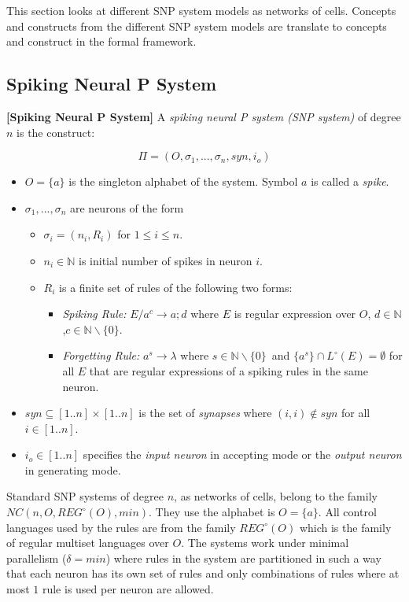 \documentclass[a4paper]{article}
\theoremstyle{definition}
\newcommand{\ra}{\rightarrow}
\begin{document}
This section looks at different SNP system models as networks of cells. Concepts and constructs from
the different SNP system models are translate to concepts and construct in the formal framework.  

\subsection{Spiking Neural P System}

\label{def-snp} \textbf{[Spiking Neural P System]} A \emph{spiking neural P system
(SNP system)} \cite{ionescu-2006-snp} of degree $n$ is the construct:

$$\Pi = (O, \sigma_1,...,\sigma_n,syn,i_o)$$

\begin{itemize}
\item $O = \{a\}$ is the singleton alphabet of the system. Symbol $a$ is called a \emph{spike}.
\item $\sigma_1,...,\sigma_n$ are neurons of the form
      \begin{itemize}
      \item $\sigma_i = (n_i, R_i)$ for $1 \leq i \leq n$. 
      \item $n_i \in \mathbb{N}$ is initial number of spikes in neuron $i$. 
      \item $R_i$ is a finite set of rules of the following two forms:
            \begin{itemize}
            \item \emph{Spiking Rule:} $E/a^c \ra a;d$ where $E$ is regular expression over $O$, 
                  $d \in \mathbb{N}$,$c \in \mathbb{N}\backslash \{0\}$.
            \item \emph{Forgetting Rule:} $a^s \ra \lambda$ where $s \in \mathbb{N}\backslash\{0\}$\
                  and $\{a^s\} \cap L^{\circ}(E) = \emptyset$ for all $E$ that are regular 
                  expressions of a spiking rules in the same neuron.
            \end{itemize}
      \end{itemize}
\item $syn \subseteq [1..n] \times [1..n]$ is the set of \emph {synapses} where $(i,i) \notin syn$ 
      for all $i \in [1..n]$.
\item $i_o \in [1..n]$ specifies the \emph{input neuron} in accepting mode or the \emph{output
      neuron} in generating mode.
\end{itemize}

Standard SNP systems of degree $n$, as networks of cells, belong to the family 
$NC(n,O,REG^{\circ}(O), min)$. They use the alphabet is $O =\{a\}$. All control languages used by 
the rules are from the family $REG^{\circ}(O)$ which is the family of regular multiset languages 
over $O$. The systems work under minimal parallelism ($\delta = min$) where rules in the system are
partitioned in such a way that each neuron has its own set of rules and only combinations of rules 
where at most $1$ rule is used per neuron are allowed.
\end{document}
